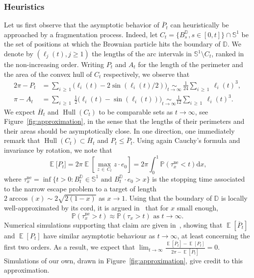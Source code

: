 \documentclass[AHL,Unicode,longabstracts,published]{cedram}
\newcommand{\D}{\mathbb{D}}
\renewcommand{\S}{\mathbb{S}}
\renewcommand{\P}{\mathbb{P}}
\DeclareMathOperator{\E}{\mathbb{E}}
\newcommand{\dd}{\mathrm{d}}
\DeclareMathOperator{\Hull}{Hull}
\DeclareMathOperator{\nee}{ne}
\renewcommand{\bar}[1]{\overline{#1}}
\begin{document}
\subsubsection{Heuristics}
Let us first observe that the asymptotic behavior of $\bar{P}_t$ can heuristically be approached by a fragmentation process. Indeed, let $C_t = \{B^\D_s, s \in [0,t]\} \cap \S^1$ be the set of positions at which the Brownian particle hits the boundary of $\D$. We denote by $(\ell_j(t), j \geq 1)$ the lengths of the arc intervals in $\S^{1} \setminus C_t$, ranked in the non-increasing order. Writing $P_t$ and $A_t$ for the length of the perimeter and the area of the convex hull of $C_t$ respectively, we observe that
\begin{equation}\label{eqn:perimeter}
\begin{split}
2 \pi - P_t &= \sum_{i\,\geq\,1} \big(\ell_i(t) - 2 \sin(\ell_i(t)/2)\big) \underset{t \to \infty}{\sim}~\frac{1}{24} \sum_{i\,\geq\,1}~\ell_i(t)^3, 
\\
\pi - A_t &= \sum_{i\,\geq\,1}~\frac{1}{2}\big(\ell_i(t) - \sin(\ell_i(t))\big) \underset{t \to \infty}{\sim} \frac{1}{12}
\sum_{i\,\geq\,1}~\ell_i(t)^3.
\end{split}
\end{equation}
We expect $\bar{H}_t$ and $\Hull(C_t)$ to be comparable sets as $t \to \infty$, see Figure~\ref{fig:approximation}, in the sense that the lengths of their perimeters and their areas should be asymptotically close. In one direction, one immediately remark that $\Hull(C_t) \subset{\bar{H}_t}$ and $P_t \leq \bar P_t$. Using again Cauchy's formula and invariance by rotation, we note that
\begin{equation*}
\E\big[P_t\big] = 2 \pi \E\left[\max_{z\,\in\,C_t} z \cdot e_0\right] = 2 \pi \int_0^1 \P\left(\tau^{\nee}_x < t\right) \dd x,
\end{equation*}
where $ \tau^{\nee}_x = \inf\{t > 0 : B^\D_t \in \S^1 \text{ and } B^\D_t \cdot e_0 > x \}$ is the stopping time associated to the narrow escape problem to a target of length $2 \arccos(x) \sim 2 \sqrt{2(1-x)}$ as $x \to 1$. Using that the boundary of $\D$ is locally well-approximated by its cord, it is argued in~\cite[Section~2.1]{DBBM22} that for $x$ small enough,
\[
\P(\tau^{\nee}_x > t) \approx \P(\tau_x > t) \text{ as $t \to \infty$}.
\]
Numerical simulations supporting that claim are given in~\cite[Appendix~A]{DBBM22}, showing that $\E[\bar{P}_t]$ and $\E[P_t]$ have similar asymptotic behaviour as $t \to \infty$, at least concerning the first two orders. As a result, we expect that $\lim_{t \to \infty} \frac{\E[\bar{P}_t] - \E[P_t]}{2\pi - \E[\bar{P}_t]} = 0$. Simulations of our own, drawn in Figure~\ref{fig:approximation}, give credit to this approximation.
\end{document}
